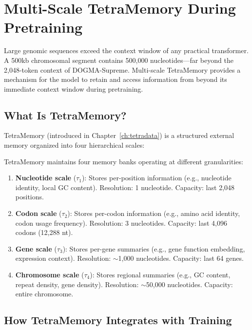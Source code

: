 \section{Multi-Scale TetraMemory During Pretraining}
\label{sec:gfm-tetramemory}

Large genomic sequences exceed the context window of any practical transformer. A 500kb chromosomal segment contains 500,000 nucleotides---far beyond the 2,048-token context of DOGMA-Supreme. Multi-scale TetraMemory provides a mechanism for the model to retain and access information from beyond its immediate context window during pretraining.

\subsection{What Is TetraMemory?}

TetraMemory (introduced in Chapter~\ref{ch:tetradata}) is a structured external memory organized into four hierarchical scales:

\begin{dogmadef}
TetraMemory maintains four memory banks operating at different granularities:
\begin{enumerate}[leftmargin=1.5em]
  \item \textbf{Nucleotide scale} ($\tau_1$): Stores per-position information (e.g., nucleotide identity, local GC content). Resolution: 1 nucleotide. Capacity: last 2,048 positions.
  \item \textbf{Codon scale} ($\tau_2$): Stores per-codon information (e.g., amino acid identity, codon usage frequency). Resolution: 3 nucleotides. Capacity: last 4,096 codons (12,288 nt).
  \item \textbf{Gene scale} ($\tau_3$): Stores per-gene summaries (e.g., gene function embedding, expression context). Resolution: $\sim$1,000 nucleotides. Capacity: last 64 genes.
  \item \textbf{Chromosome scale} ($\tau_4$): Stores regional summaries (e.g., GC content, repeat density, gene density). Resolution: $\sim$50,000 nucleotides. Capacity: entire chromosome.
\end{enumerate}
\end{dogmadef}

\subsection{How TetraMemory Integrates with Training}

